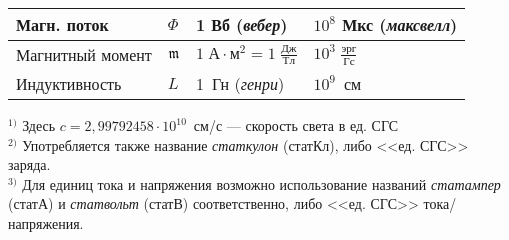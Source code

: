\begin{booksupplement}
\begin{table}
\begin{tabular}{m{29mm}m{11mm}m{26mm}m{35mm}}
        Магн. поток  & $\Phi$ & 1 Вб (\emph{вебер})
                     & $10^8$ Мкс (\emph{максвелл})                    \bigstrut\\ \hline
        Магнитный момент    & $\mathfrak{m}$ & $1\;А\cdot м^2 = 1\;\frac{Дж}{Тл}$
                        & $10^3\;\frac{эрг}{Гс}$                       \bigstrut\\ \hline
        Индуктивность & $L$ & 1~Гн (\emph{генри})
                      & $10^9$~см                                      \bigstrut\\
\bottomrule[1pt]
    \end{tabular}
    \endgroup
    \vspace*{-0.7\baselineskip}
    \flushleft
    \noindent\footnotesize{}$^{1)}$ Здесь $c = 2,99792458\cdot 10^{10}$~см/с --- скорость света в ед. СГС\\
    $^{2)}$ Употребляется также название \emph{статкулон} (статКл),
    либо <<ед. СГС>> заряда. \\
    $^{3)}$ Для единиц тока и напряжения возможно использование
    названий \emph{статампер} (статА) и \emph{статвольт} (статВ) соответственно,
    либо <<ед. СГС>> тока/напряжения.
\end{table}

\newpage



\end{booksupplement}
